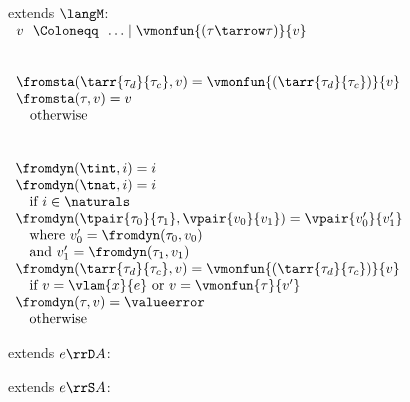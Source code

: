 \begin{flushleft}

\begin{minipage}[t]{0.5\textwidth}
 extends $\langM$:\\
$\begin{array}{l@{~~}c@{~~}l}
  v & \Coloneqq & \ldots \mid \vmonfun{(\tau\tarrow\tau)}{v}
\end{array}$

\medskip
{}\\
$\begin{array}{l}
  \fromsta(\tarr{\tau_d}{\tau_c}, v) = \vmonfun{(\tarr{\tau_d}{\tau_c})}{v}
\\
  \fromsta(\tau, v) = v
\\ \mbox{\quad otherwise}
\end{array}$
\end{minipage}%
\begin{minipage}[t]{0.5\textwidth}
\\
$\begin{array}{l}
  \fromdyn(\tint, i) = i
\\
  \fromdyn(\tnat, i) = i
\\ \mbox{\quad if $i \in \naturals$}
\\
  \fromdyn(\tpair{\tau_0}{\tau_1}, \vpair{v_0}{v_1}) = \vpair{v_0'}{v_1'}
\\ \mbox{\quad where $v_0' = \fromdyn(\tau_0, v_0)$}
\\ \mbox{\quad and $v_1' = \fromdyn(\tau_1, v_1)$}
\\
  \fromdyn(\tarr{\tau_d}{\tau_c}, v) = \vmonfun{(\tarr{\tau_d}{\tau_c})}{v}
\\ \mbox{\quad if $v = \vlam{x}{e}$ or $v = \vmonfun{\tau}{v'}$}
\\
  \fromdyn(\tau, v) = \valueerror
\\ \mbox{\quad otherwise}
\end{array}$
\end{minipage}

\medskip
\begin{minipage}[t]{0.5\textwidth}
 extends $e \rrD A$:
\begin{mathpar}
\end{mathpar}
\end{minipage}%
\begin{minipage}[t]{0.5\textwidth}
 extends $e \rrS A$:
\begin{mathpar}
\end{mathpar}
\end{minipage}%


\end{flushleft}
